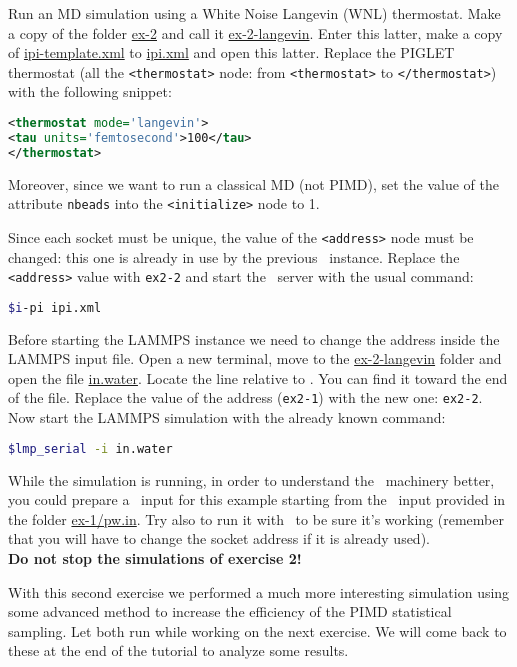\documentclass{article}
\begin{document}
\begin{Exercise}[label={inputs},title={Liquid water with the
    \emph{PIGLET} thermostat}]
\Question
Run an MD simulation using a White Noise Langevin (WNL) thermostat.
Make a copy of the folder
\url{ex-2} and call it \url{ex-2-langevin}. Enter this latter, make a
copy of \url{ipi-template.xml} to \url{ipi.xml} and open this latter.
Replace the PIGLET thermostat (all the \texttt{<thermostat>} node:
from \texttt{<thermostat>} to \texttt{</thermostat>}) with the
following snippet:
\begin{lstlisting}[language=xml]
<thermostat mode='langevin'>
<tau units='femtosecond'>100</tau>
</thermostat>
\end{lstlisting}
Moreover, since we want to run a classical MD (not PIMD), set the
value of the attribute \texttt{nbeads} into the \texttt{<initialize>}
node to 1.

Since each socket must be unique, the value of the \texttt{<address>}
node must be changed: this one is already in use by the previous \ipi\
instance. Replace the \texttt{<address>} value with \texttt{ex2-2} and
start the \ipi\ server with the usual command:
\begin{lstlisting}[language=bash]
$i-pi ipi.xml
\end{lstlisting}%

Before starting the LAMMPS instance we need to change the address
inside the LAMMPS input file. Open a new terminal, move to the
\url{ex-2-langevin} folder and open the file \url{in.water}. Locate
the line relative to \ipi. You can find it toward the end of the
file. Replace the value of the address (\texttt{ex2-1}) with the new
one: \texttt{ex2-2}. Now start the LAMMPS simulation with the already
known command:
\begin{lstlisting}[language=bash]
$lmp_serial -i in.water
\end{lstlisting}%


While the simulation is running, in order to
understand the \ipi\ machinery better, you could prepare a \pwx\ input
for this example starting from the \pwx\ input provided in the folder
\url{ex-1/pw.in}. Try also to run it with \ipi\ to be sure it's
working (remember that you will have to change the socket address if
it is already used).\\
\vspace{2em}
\textbf{Do not stop the simulations of exercise 2!}

\end{Exercise}

With this second exercise we performed a much more interesting
simulation using some advanced method to increase the efficiency of
the PIMD statistical sampling. Let both run while
working on the next exercise. We will come back to these at the end of
the tutorial to analyze some results.
\end{document}
